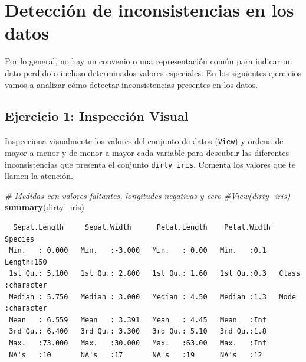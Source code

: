 \documentclass[
]{article}
\newenvironment{Shaded}{\begin{snugshade}}{\end{snugshade}}
\newcommand{\CommentTok}[1]{\textcolor[rgb]{0.56,0.35,0.01}{\textit{#1}}}
\newcommand{\FunctionTok}[1]{\textcolor[rgb]{0.13,0.29,0.53}{\textbf{#1}}}
\newcommand{\NormalTok}[1]{#1}
\begin{document}
\section{Detección de inconsistencias en los
datos}\label{detecciuxf3n-de-inconsistencias-en-los-datos}

Por lo general, no hay un convenio o una representación común para
indicar un dato perdido o incluso determinados valores especiales. En
los siguientes ejercicios vamos a analizar cómo detectar inconsistencias
presentes en los datos.

\subsection{Ejercicio 1: Inspección
Visual}\label{ejercicio-1-inspecciuxf3n-visual}

Inspecciona visualmente los valores del conjunto de datos
(\texttt{View}) y ordena de mayor a menor y de menor a mayor cada
variable para descubrir las diferentes inconsistencias que presenta el
conjunto \texttt{dirty\_iris}. Comenta los valores que te llamen la
atención.

\begin{Shaded}
\begin{Highlighting}[]
\CommentTok{\# Medidas con valores faltantes, longitudes negativas y cero}
\CommentTok{\#View(dirty\_iris)}
\FunctionTok{summary}\NormalTok{(dirty\_iris)}
\end{Highlighting}
\end{Shaded}

\begin{verbatim}
  Sepal.Length     Sepal.Width      Petal.Length    Petal.Width    Species         
 Min.   : 0.000   Min.   :-3.000   Min.   : 0.00   Min.   :0.1   Length:150        
 1st Qu.: 5.100   1st Qu.: 2.800   1st Qu.: 1.60   1st Qu.:0.3   Class :character  
 Median : 5.750   Median : 3.000   Median : 4.50   Median :1.3   Mode  :character  
 Mean   : 6.559   Mean   : 3.391   Mean   : 4.45   Mean   :Inf                     
 3rd Qu.: 6.400   3rd Qu.: 3.300   3rd Qu.: 5.10   3rd Qu.:1.8                     
 Max.   :73.000   Max.   :30.000   Max.   :63.00   Max.   :Inf                     
 NA's   :10       NA's   :17       NA's   :19      NA's   :12                      
\end{verbatim}
\end{document}
